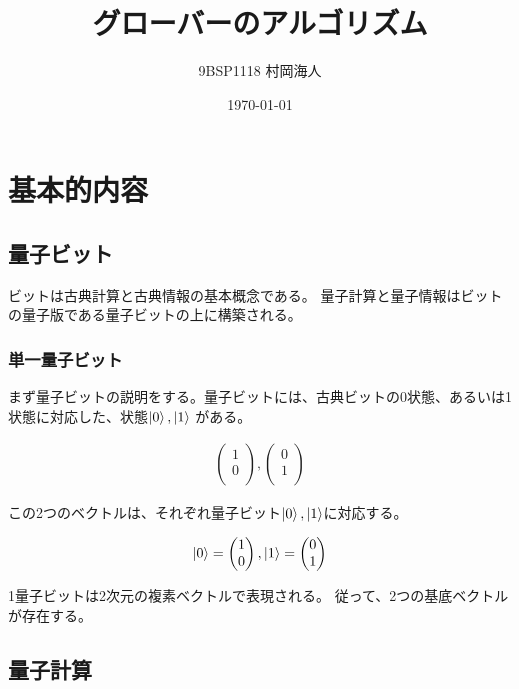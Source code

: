 \documentclass[platex,dvipdfmx]{jlreq}			%
\title{グローバーのアルゴリズム}
\author{9BSP1118 村岡海人}
\date{\today}
\begin{document}
\maketitle

\section{基本的内容}
\subsection{量子ビット}
ビットは古典計算と古典情報の基本概念である。
量子計算と量子情報はビットの量子版である量子ビットの上に構築される。
\subsubsection{単一量子ビット}
まず量子ビットの説明をする。量子ビットには、古典ビットの0状態、あるいは1状態に対応した、状態$\ket{0}, \ket{1}$ がある。

\begin{eqnarray}
    \begin{pmatrix}
        1 \\
        0 \\
    \end{pmatrix}
    ,
    \begin{pmatrix}
        0 \\
        1 \\
    \end{pmatrix}
\end{eqnarray}

この2つのベクトルは、それぞれ量子ビット$\ket{0}, \ket{1}$に対応する。

\begin{eqnarray}
    \ket{0} =
    \begin{pmatrix}
        1 \\
        0 \\
    \end{pmatrix}
    ,
    \ket{1} = 
    \begin{pmatrix}
        0 \\
        1 \\
    \end{pmatrix}
\end{eqnarray}

1量子ビットは2次元の複素ベクトルで表現される。
従って、2つの基底ベクトルが存在する。


\subsection{量子計算}
    
\end{document}
